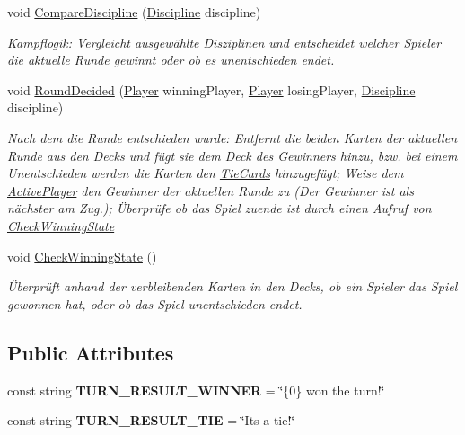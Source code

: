 \begin{DoxyCompactItemize}
void \mbox{\hyperlink{class_main_window_a4bbff733cfab680758c3fcc80a0de055}{Compare\+Discipline}} (\mbox{\hyperlink{namespace_poke_quet_aa425f1b8cf90847021fe1177d6a7199d}{Discipline}} discipline)
\begin{DoxyCompactList}\small\item\em Kampflogik\+: Vergleicht ausgewählte Disziplinen und entscheidet welcher Spieler die aktuelle Runde gewinnt oder ob es unentschieden endet. \end{DoxyCompactList}\item 
void \mbox{\hyperlink{class_main_window_a94a1278f08f427a805ea3fedf760e03c}{Round\+Decided}} (\mbox{\hyperlink{class_poke_quet_1_1_player}{Player}} winning\+Player, \mbox{\hyperlink{class_poke_quet_1_1_player}{Player}} losing\+Player, \mbox{\hyperlink{namespace_poke_quet_aa425f1b8cf90847021fe1177d6a7199d}{Discipline}} discipline)
\begin{DoxyCompactList}\small\item\em Nach dem die Runde entschieden wurde\+: Entfernt die beiden Karten der aktuellen Runde aus den Decks und fügt sie dem Deck des Gewinners hinzu, bzw. bei einem Unentschieden werden die Karten den \mbox{\hyperlink{class_main_window_a71f4eaa448a91297c8c54786e5c0516e}{Tie\+Cards}} hinzugefügt; Weise dem \mbox{\hyperlink{class_main_window_a4ce463cb4e7d116640b55416557ea741}{Active\+Player}} den Gewinner der aktuellen Runde zu (Der Gewinner ist als nächster am Zug.); Überprüfe ob das Spiel zuende ist durch einen Aufruf von \mbox{\hyperlink{class_main_window_a74ec52917be1fdf6a641639d5da39d53}{Check\+Winning\+State}} \end{DoxyCompactList}\item 
void \mbox{\hyperlink{class_main_window_a74ec52917be1fdf6a641639d5da39d53}{Check\+Winning\+State}} ()
\begin{DoxyCompactList}\small\item\em Überprüft anhand der verbleibenden Karten in den Decks, ob ein Spieler das Spiel gewonnen hat, oder ob das Spiel unentschieden endet. \end{DoxyCompactList}\end{DoxyCompactItemize}
\subsection*{Public Attributes}
\begin{DoxyCompactItemize}
\item 
\mbox{\label{class_main_window_ae149b6fbe2080c77fe7bf34880fe4b15}} 
const string {\bfseries T\+U\+R\+N\+\_\+\+R\+E\+S\+U\+L\+T\+\_\+\+W\+I\+N\+N\+ER} = \char`\"{}\{0\} won the turn!\char`\"{}
\item 
\mbox{\label{class_main_window_a678df4fce522ee399f2d91901da72004}} 
const string {\bfseries T\+U\+R\+N\+\_\+\+R\+E\+S\+U\+L\+T\+\_\+\+T\+IE} = \char`\"{}It\textquotesingle{}s a tie!\char`\"{}
\end{DoxyCompactItemize}
